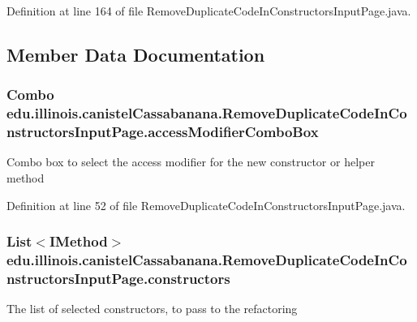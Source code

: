 Definition at line 164 of file RemoveDuplicateCodeInConstructorsInputPage.java.



\subsection{Member Data Documentation}
\hypertarget{classedu_1_1illinois_1_1canistelCassabanana_1_1RemoveDuplicateCodeInConstructorsInputPage_ad900b2c0bfbdbac5a701b3e5834f1962}{
\subsubsection[{accessModifierComboBox}]{\setlength{\rightskip}{0pt plus 5cm}Combo {\bf edu.illinois.canistelCassabanana.RemoveDuplicateCodeInConstructorsInputPage.accessModifierComboBox}}}
\label{classedu_1_1illinois_1_1canistelCassabanana_1_1RemoveDuplicateCodeInConstructorsInputPage_ad900b2c0bfbdbac5a701b3e5834f1962}
Combo box to select the access modifier for the new constructor or helper method 

Definition at line 52 of file RemoveDuplicateCodeInConstructorsInputPage.java.

\hypertarget{classedu_1_1illinois_1_1canistelCassabanana_1_1RemoveDuplicateCodeInConstructorsInputPage_acdcd523154c691ec0083de31b628b54d}{
\subsubsection[{constructors}]{\setlength{\rightskip}{0pt plus 5cm}List$<$IMethod$>$ {\bf edu.illinois.canistelCassabanana.RemoveDuplicateCodeInConstructorsInputPage.constructors}}}
\label{classedu_1_1illinois_1_1canistelCassabanana_1_1RemoveDuplicateCodeInConstructorsInputPage_acdcd523154c691ec0083de31b628b54d}
The list of selected constructors, to pass to the refactoring 

